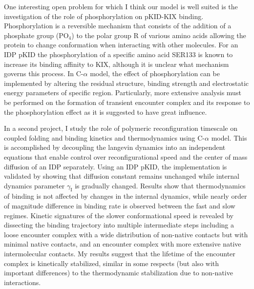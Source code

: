 \documentclass[../talant.diss.submit.tex]{subfiles}
\begin{document}
One interesting open problem for which I think our model is well suited is the 
investigation of the role of phosphorylation on pKID-KIX binding. %
Phosphorylation is a reversible mechanism that consists of the addition of a
phosphate group ($\mathrm{PO}_{4}$) to the polar group R of various amino acids
allowing the protein to change conformation when interacting with other molecules.
For an IDP pKID the phosphorylation of a specific amino acid SER133 is
known to increase its binding affinity to KIX\cite{radhakrishnan:98,kwok:94n},
although it is unclear what mechanism governs this process. In C-$\alpha$ model,
the effect of phosphorylation can be implemented by altering the residual structure, binding
strength and electrostatic energy parameters of specific region. Particularly,
more extensive analysis must be performed on the formation of transient encounter
complex and its response to the phosphorylation effect as it is suggested to
have great influence.\cite{dahal:17ph}



In a second project, I study the role of polymeric reconfiguration timescale
on coupled folding and binding kinetics and thermodynamics using C-$\alpha$ model.
This is accomplished by decoupling the langevin dynamics into an independent equations
that enable control over reconfigurational speed and the center of mass diffusion of an
IDP separately. Using an IDP pKID, the implementation is validated by showing that
diffusion constant remains unchanged while internal dynamics parameter $\gamma_{\mathrm{I}}$
is gradually changed. Results show that thermodynamics of binding is not affected by changes
in the internal dynamics, while nearly order of magnitude difference in binding
rate is observed between the fast and slow regimes.
Kinetic signatures of the slower conformational speed is revealed 
by dissecting the binding trajectory into multiple intermediate steps including a loose encounter complex
with a wide distribution of non-native contacts but with minimal native contacts,
and an encounter complex with more extensive native intermolecular contacts. 
My results suggest that the lifetime of the encounter complex is kinetically stabilized,
similar in some respects (but also with important differences) to the thermodynamic
stabilization due to non-native interactions. 
\end{document}
